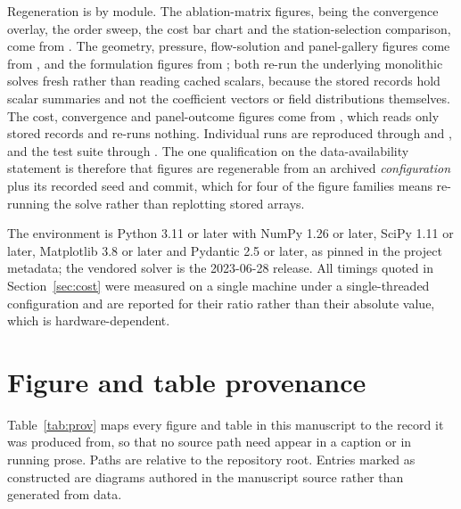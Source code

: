 Regeneration is by module. The ablation-matrix figures, being the convergence
overlay, the order sweep, the cost bar chart and the station-selection
comparison, come from . The geometry, pressure,
flow-solution and panel-gallery figures come from
, and the formulation figures from
; both re-run the underlying
monolithic solves fresh rather than reading cached scalars, because the stored
records hold scalar summaries and not the coefficient vectors or field
distributions themselves. The cost, convergence and panel-outcome figures come
from , which reads only stored
records and re-runs nothing. Individual runs are reproduced through
 and , and the
test suite through . The one qualification on the
data-availability statement is therefore that figures are regenerable from an
archived \emph{configuration} plus its recorded seed and commit, which for
four of the figure families means re-running the solve rather than replotting
stored arrays.

The environment is Python 3.11 or later with NumPy 1.26 or later, SciPy 1.11
or later, Matplotlib 3.8 or later and Pydantic 2.5 or later, as pinned in the
project metadata; the vendored solver is the 2023-06-28 release. All timings
quoted in Section~\ref{sec:cost} were measured on a single machine under a
single-threaded configuration and are reported for their ratio rather than
their absolute value, which is hardware-dependent.

\section{Figure and table provenance}
\label{app:prov}

Table~\ref{tab:prov} maps every figure and table in this manuscript to the
record it was produced from, so that no source path need appear in a caption
or in running prose. Paths are relative to the repository root. Entries marked
as constructed are diagrams authored in the manuscript source rather than
generated from data.

